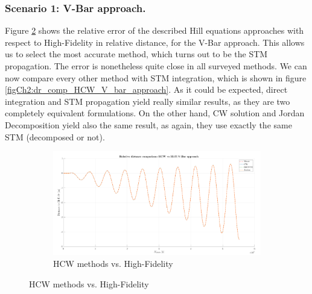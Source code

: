 		\subsubsection{Scenario 1: V-Bar approach. }
		\indent Figure \ref{figCh2:dr_comp_HiFi_V_bar_approach} shows the relative error of the described Hill equations approaches with respect to High-Fidelity in relative distance, for the V-Bar approach. This allows us to select the most accurate method, which turns out to be the STM propagation. The error is nonetheless quite close in all surveyed methods. We can now compare every other method with STM integration, which is shown in figure \ref{figCh2:dr_comp_HCW_V_bar_approach}. As it could be expected, direct integration and STM propagation yield really similar results, as they are two completely equivalent formulations. On the other hand, CW solution and Jordan Decomposition yield also the same result, as again, they use exactly the same STM (decomposed or not).
		\begin{figure}[!htb]
		\centering
		\begin{subfigure}[t]{\linewidth}
		\begin{changemargin}{-1.3cm}{-1cm}
		\begin{adjustbox}{width=1.1\textwidth}
		\centering\includegraphics[width = \linewidth]{Chapters/Chapter_02/dr_comp_V_bar_approach}
		\end{adjustbox}
		\end{changemargin}
		\caption{HCW methods vs. High-Fidelity}
		\label{figCh2:dr_comp_HiFi_V_bar_approach}
		\end{subfigure}
		\end{figure}
